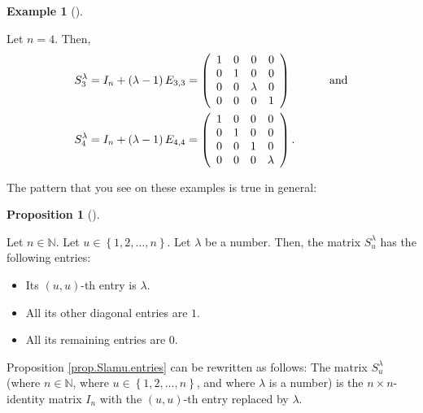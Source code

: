 \documentclass[numbers=enddot,12pt,final,onecolumn,notitlepage]{scrartcl}%
\theoremstyle{definition}
\newtheorem{prop}[theo]{Proposition}
\newenvironment{proposition}[1][]
{\begin{prop}[#1]\begin{leftbar}}
{\end{leftbar}\end{prop}}
\newtheorem{exam}[theo]{Example}
\newenvironment{example}[1][]
{\begin{exam}[#1]\begin{leftbar}}
{\end{leftbar}\end{exam}}
\begin{document}
\begin{example}
\label{exe.Slamu}Let $n=4$. Then,%
\begin{align*}
S_{3}^{\lambda}  &  =I_{n}+\left(  \lambda-1\right)  E_{3,3}=\left(
\begin{array}
[c]{cccc}%
1 & 0 & 0 & 0\\
0 & 1 & 0 & 0\\
0 & 0 & \lambda & 0\\
0 & 0 & 0 & 1
\end{array}
\right)  \ \ \ \ \ \ \ \ \ \ \text{and}\\
S_{4}^{\lambda}  &  =I_{n}+\left(  \lambda-1\right)  E_{4,4}=\left(
\begin{array}
[c]{cccc}%
1 & 0 & 0 & 0\\
0 & 1 & 0 & 0\\
0 & 0 & 1 & 0\\
0 & 0 & 0 & \lambda
\end{array}
\right)  .
\end{align*}

\end{example}

The pattern that you see on these examples is true in general:

\begin{proposition}
\label{prop.Slamu.entries}Let $n\in\mathbb{N}$. Let $u\in\left\{
1,2,\ldots,n\right\}  $. Let $\lambda$ be a number. Then, the matrix
$S_{u}^{\lambda}$ has the following entries:

\begin{itemize}
\item Its $\left(  u,u\right)  $-th entry is $\lambda$.

\item All its other diagonal entries are $1$.

\item All its remaining entries are $0$.
\end{itemize}
\end{proposition}

Proposition \ref{prop.Slamu.entries} can be rewritten as follows: The matrix
$S_{u}^{\lambda}$ (where $n\in\mathbb{N}$, where $u\in\left\{  1,2,\ldots
,n\right\}  $, and where $\lambda$ is a number) is the $n\times n$-identity
matrix $I_{n}$ with the $\left(  u,u\right)  $-th entry replaced by $\lambda$.
\end{document}
